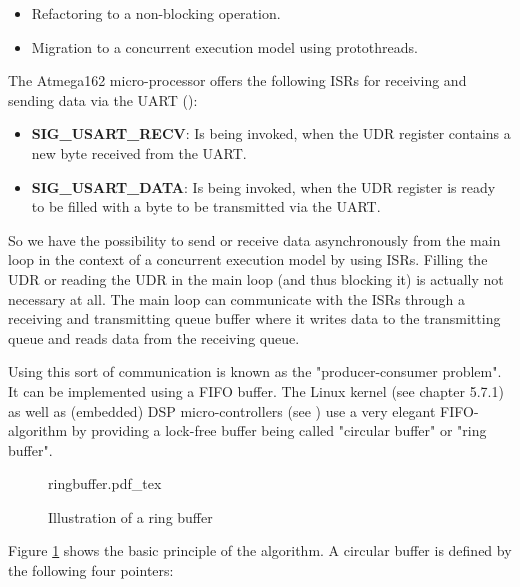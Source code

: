 \begin{itemize}
\item Refactoring to a non-blocking operation.
\item Migration to a concurrent execution model using protothreads.
\end{itemize}

The Atmega162 micro-processor offers the following ISRs for receiving and sending data via the UART (\cite{atmega162datasheet}):

\begin{itemize}
\item \textbf{SIG\_USART\_RECV}: Is being invoked, when the UDR register contains a new byte received from the UART.
\item \textbf{SIG\_USART\_DATA}: Is being invoked, when the UDR register is ready to be filled with a byte to be transmitted via the UART.
\end{itemize}

So we have the possibility to send or receive data asynchronously from the main loop in the context of a concurrent execution model by using ISRs. Filling the UDR or reading the UDR in the main loop (and thus blocking it) is actually not necessary at all. The main loop can communicate with the ISRs through a receiving and transmitting queue buffer where it writes data to the transmitting queue and reads data from the receiving queue.

Using this sort of communication is known as the "producer-consumer problem". It can be implemented using a FIFO buffer. The Linux kernel (see \cite{linux_device_drivers} chapter 5.7.1) as well as (embedded) DSP micro-controllers (see \cite{ti_dsp}) use a very elegant FIFO-algorithm by providing a lock-free buffer being called "circular buffer" or "ring buffer".

\begin{figure}[H]
\centering
{ringbuffer.pdf_tex}
\caption[]{Illustration of a ring buffer}
\label{fig:ringbuffer}
\end{figure}

Figure \ref{fig:ringbuffer} shows the basic principle of the algorithm. A circular buffer is defined by the following four pointers:


